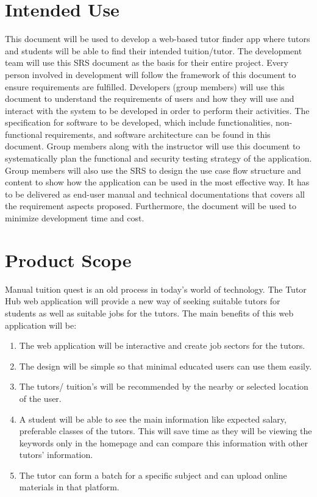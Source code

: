\section{Intended Use}
This document will be used to develop a web-based tutor finder app where tutors and students will be able to find their intended tuition/tutor. The development team will use this SRS document as the basis for their entire project. Every person involved in development will follow the framework of this document to ensure requirements are fulfilled. Developers (group members) will use this document to understand the requirements of users and how they will use and interact with the system to be developed in order to perform their activities. The specification for software to be developed, which include functionalities, non-functional requirements, and software architecture can be found in this document. 
Group members along with the instructor will use this document to systematically plan the functional and security testing strategy of the application. Group members will also use the SRS to design the use case flow structure and content to show how the application can be used in the most effective way. It has to be delivered as end-user manual and technical documentations that covers all the requirement aspects proposed. Furthermore, the document will be used to minimize development time and cost.
\section{Product Scope}
Manual tuition quest is an old process in today's world of technology. The Tutor Hub web application will provide a new way of seeking suitable tutors for students as well as suitable jobs for the tutors. 
The main benefits of this web application will be:
      
\begin{enumerate}
\item The web application will be interactive and create job sectors for the tutors.   
\item The design will be simple so that minimal educated users can use them easily.
\item The tutors/ tuition's will be recommended by the nearby or selected location of the user. 
\item  A student will be able to see the main information like expected salary, preferable classes of the tutors. This will save time as they will be viewing the keywords only in the homepage and can compare this information with other tutors' information.
\item The tutor can form a batch for a specific subject and can upload online materials in that platform.
\end{enumerate}

